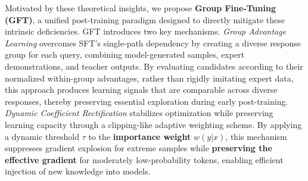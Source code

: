 Motivated by these theoretical insights, we propose \textbf{Group Fine-Tuning (GFT)}, a unified post-training paradigm designed to directly mitigate these intrinsic deficiencies.
GFT introduces two key mechanisms.
\emph{Group Advantage Learning} overcomes SFT's single-path dependency by creating a diverse response group for each query, combining model-generated samples, expert demonstrations, and teacher outputs.
By evaluating candidates according to their normalized within-group advantages, rather than rigidly imitating expert data, this approach produces learning signals that are comparable across diverse responses, thereby preserving essential exploration during early post-training.
\emph{Dynamic Coefficient Rectification} stabilizes optimization while preserving learning capacity through a clipping-like adaptive weighting scheme.
By applying a dynamic threshold $\tau$ to the \textbf{importance weight} $w(y|x)$, this mechanism suppresses gradient explosion for extreme samples while \textbf{preserving the effective gradient} for moderately low-probability tokens, enabling efficient injection of new knowledge into models.


